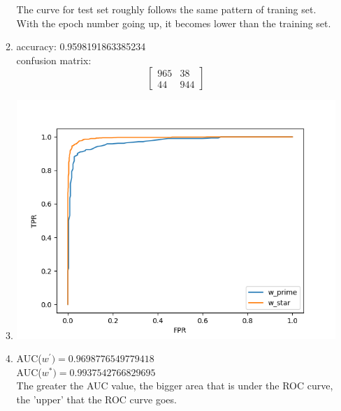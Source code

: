 \documentclass[11pt, oneside]{article}   	%
\begin{document}
\begin{enumerate}
\begin{enumerate}
    The curve for test set roughly follows the same pattern of traning set. With the epoch number going up,  it becomes lower than the training set.
  \item	%
    accuracy: 0.9598191863385234\\
    confusion matrix:
    \[
    \left[
      \begin{array}{cc}
	965	&	38\\
	44	&	944
      \end{array}
      \right]
    \]
  \item %
    \includegraphics[width=15cm]{2_1d.png}
  \item %
    AUC($ w^\prime) = 0.9698776549779418$\\
    AUC($ w^*) = 0.9937542766829695$\\
    The greater the AUC value, the bigger area that is under the ROC curve, the 'upper' that the ROC curve goes.
  \end{enumerate}


\end{enumerate}
\end{document}
